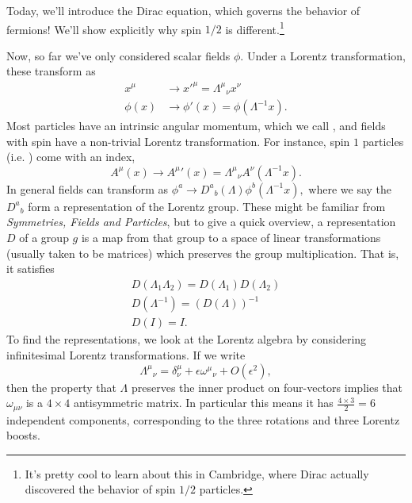 Today, we'll introduce the Dirac equation, which governs the behavior of fermions! We'll show explicitly why spin $1/2$ is different.\footnote{It's pretty cool to learn about this in Cambridge, where Dirac actually discovered the behavior of spin $1/2$ particles.}

Now, so far we've only considered scalar fields $\phi$. Under a Lorentz transformation, these transform as
\begin{align*}
    x^\mu & \to {x'}^\mu = {\Lambda^\mu}_\nu x^\nu\\
    \phi(x) & \to \phi'(x)=\phi(\Lambda^{-1}x).
\end{align*}
Most particles have an intrinsic angular momentum, which we call , and fields with spin have a non-trivial Lorentz transformation. For instance, spin $1$ particles (i.e. ) come with an index,
$$A^\mu(x)\to {A^\mu}'(x)={\Lambda^\mu}_\nu A^\nu(\Lambda^{-1} x).$$
In general fields can transform as $\phi^a \to {D^a}_b(\Lambda) \phi^b(\Lambda^{-1}x),$
where we say the ${D^a}_b$ form a representation of the Lorentz group. These might be familiar from \emph{Symmetries, Fields and Particles}, but to give a quick overview, a representation $D$ of a group $g$ is a map from that group to a space of linear transformations (usually taken to be matrices) which preserves the group multiplication. That is, it satisfies
\begin{gather*}
    D(\Lambda_1\Lambda_2)=D(\Lambda_1)D(\Lambda_2)\\
    D(\Lambda^{-1})=(D(\Lambda))^{-1}\\
    D(I)= I.
\end{gather*}
To find the representations, we look at the Lorentz algebra by considering infinitesimal Lorentz transformations. If we write
$${\Lambda^\mu}_\nu=\delta^\mu_\nu+\epsilon {\omega^\mu}_\nu+O(\epsilon^2),$$
then the property that $\Lambda$ preserves the inner product on four-vectors implies that $\omega_{\mu\nu}$ is a $4\times 4$ antisymmetric matrix. In particular this means it has $\frac{4\times 3}{2}=6$ independent components, corresponding to the three rotations and three Lorentz boosts.

